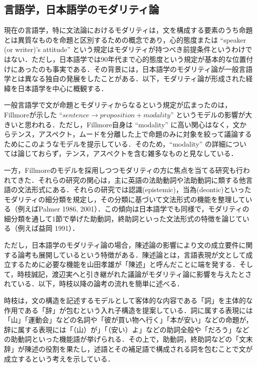 \documentclass[japanese]{jnlp_1.4}
\begin{document}
\subsection{言語学，日本語学のモダリティ論}

現在の言語学，特に文法論におけるモダリティは，文を構成する要素のうち命題とは異質なものを命題と区別するための概念であり，心的態度または ``speaker (or writer)'s attitude'' という規定はモダリティが持つべき前提条件というわけではない．ただし，日本語学では90年代まで心的態度という規定が基本的な位置付けにあったのも事実である．その背景には，日本語学のモダリティ論が一般言語学とは異なる独自の発展をしたことがある．以下，モダリティ論が形成された経緯を日本語学を中心に概観する．

一般言語学で文が命題とモダリティからなるという規定が広まったのは，Fillmoreが示した ``$sentence \rightarrow proposition + modality$'' というモデル\cite{Inbook_01}の影響が大きいと思われる．ただし，Fillmore自身は ``modality'' に高い関心はなく，文からテンス，アスペクト，ムードを分離した上で命題のみに対象を絞って議論するためにこのようなモデルを提示している．そのため，``modality'' の詳細については論じておらず，テンス，アスペクトを含む雑多なものと見なしている．

一方，Fillmoreのモデルを採用しつつモダリティの方に焦点を当てる研究も行われてきた．それらの研究の関心は，主に英語の法助動詞や法助動詞に類する他言語の文法形式にある．それらの研究では認識(epistemic)，当為(deontic)といったモダリティの細分類を規定し，その分類に基づいて文法形式の機能を整理している（例えばPalmer 1986, 2001）．この傾向は日本語学でも同様で，モダリティの細分類を通して1節で挙げた助動詞，終助詞といった文法形式の特徴を論じている（例えば益岡 1991）．

ただし，日本語学のモダリティ論の場合，陳述論の影響により文の成立要件に関する論考も展開しているという特徴がある．陳述論とは，言語表現が文として成立するために必要な機能を山田孝雄が「陳述」と呼んだことに端を発する．そして，時枝誠記，渡辺実へと引き継がれた議論がモダリティ論に影響を与えたとされている\cite{Book_06}．以下，時枝以降の論考の流れを簡単に述べる．

時枝は，文の構造を記述するモデルとして客体的な内容である「詞」を主体的な作用である「辞」が包むという入れ子構造を提案している\cite{Book_19}．詞に属する表現には「山」「運動会」などの名詞や「彼が買い物へ行く」「本が安い」などの命題が，辞に属する表現には「（山）が」「（安い）よ」などの助詞全般や「だろう」などの助動詞といった機能語が挙げられる．その上で，助動詞，終助詞などの「文末辞」が陳述の役割を果たし，述語とその補足語で構成される詞を包むことで文が成立するという考えを示している．
\end{document}
